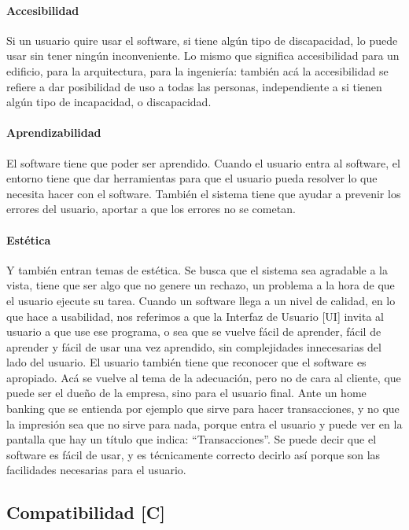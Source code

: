 \hypertarget{accesibilidad}{%
\paragraph{Accesibilidad}\label{accesibilidad}}
Si un usuario quire usar el software, si tiene
  algún tipo de discapacidad, lo puede usar sin tener ningún
  inconveniente. Lo mismo que significa accesibilidad para un edificio,
  para la arquitectura, para la ingeniería: también acá la accesibilidad
  se refiere a dar posibilidad de uso a todas las personas,
  independiente a si tienen algún tipo de incapacidad, o discapacidad.
\hypertarget{aprendizabilidad}{%
\paragraph{Aprendizabilidad}\label{aprendizabilidad}}
 El software tiene que poder ser aprendido.
  Cuando el usuario entra al software, el entorno tiene que dar
  herramientas para que el usuario pueda resolver lo que necesita hacer
  con el software.
  También el sistema tiene que ayudar a prevenir los
  errores del usuario, aportar a que los errores no se cometan.
\hypertarget{estetica}{%
\paragraph{Estética}\label{estetica}}
  Y también entran temas de estética. Se busca que el sistema sea
  agradable a la vista, tiene que ser algo que no genere un rechazo, un
  problema a la hora de que el usuario ejecute su tarea. Cuando un
  software llega a un nivel de calidad, en lo que hace a usabilidad, nos
  referimos a que la Interfaz de Usuario {[}UI{]} invita al usuario a
  que use ese programa, o sea que se vuelve fácil de aprender, fácil de
  aprender y fácil de usar una vez aprendido, sin complejidades
  innecesarias del lado del usuario. El usuario también tiene que
  reconocer que el software es apropiado. Acá se vuelve al tema de la
  adecuación, pero no de cara al cliente, que puede ser el dueño de la
  empresa, sino para el usuario final. Ante un home banking que se
  entienda por ejemplo que sirve para hacer transacciones, y no que la
  impresión sea que no sirve para nada, porque entra el usuario y puede
  ver en la pantalla que hay un título que indica: ``Transacciones''. Se
  puede decir que el software es fácil de usar, y es técnicamente
  correcto decirlo así porque son las facilidades necesarias para el
  usuario.

\hypertarget{compatibilidad-c}{%
\subsection{Compatibilidad {[}C{]}}\label{compatibilidad-c}}


